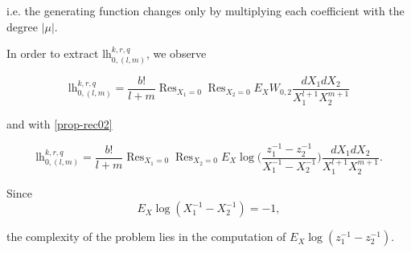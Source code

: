 \documentclass[10pt,a4paper,oneside,no-math,reqno]{amsart}%
\theoremstyle{plain}
\theoremstyle{definition}
\theoremstyle{remark}
\numberwithin{equation}{section}
\newcommand{\1}{\mathds{1}}
\newcommand{\<}{\langle}
\renewcommand{\>}{\rangle}
\DeclareMathOperator*{\Res}{Res}
\newcommand{\lh}{\mathord{\mathrm{l\!h}}}
\begin{document}
i.e. the generating function changes only by multiplying each coefficient with the degree $|\mu|$.

In order to extract $\lh_{0,(l,m)}^{k,r,q}$, we observe

\begin{equation}
    \lh_{0,(l,m)}^{k,r,q}
    =
    \frac{b!}{l+m}\Res_{X_1=0} \Res_{X_2=0} E_X W_{0,2} \frac{dX_1 dX_2}{X_1^{l+1} X_2^{m+1}}
\end{equation}

and with \cref{prop-rec02}

\begin{equation}
    \lh_{0,(l,m)}^{k,r,q}
    =
    \frac{b!}{l+m} \Res_{X_1=0} \Res_{X_2=0} E_X \log \big( \frac{z_1^{-1} - z_2^{-1}}{X_1^{-1} - X_2^{-1}} \big) \frac{dX_1 dX_2}{X_1^{l+1} X_2^{m+1}} .
\end{equation}

Since
\begin{equation}
    E_X \log (X_1^{-1} - X_2^{-1})
    =
    -1,
\end{equation}

the complexity of the problem lies in the computation of $E_X \log (z_1^{-1} - z_2^{-1})$. 
\end{document}
